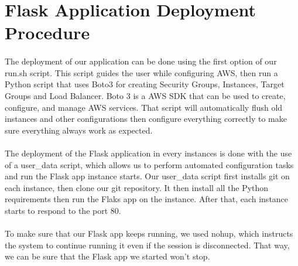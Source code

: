 \section{Flask Application Deployment Procedure} \label{T1}

\paragraph{}The deployment of our application can be done using the first option of our run.sh script. This script guides the user while configuring AWS, then run a Python script that uses Boto3 for creating Security Groups, Instances, Target Groups and Load Balancer. Boto 3 is a AWS SDK that can be used to create, configure, and manage AWS services. That script will automatically flush old instances and other configurations then configure everything correctly to make sure everything always work as expected.
\paragraph{}The deployment of the Flask application in every instances is done with the use of a user\_data script, which allows us to perform automated configuration tasks and run the Flask app instance starts. Our user\_data script first installs git on each instance, then clone our git repository. It then install all the Python requirements then run the Flaks app on the instance. After that, each instance starts to respond to the port 80.
\paragraph{}To make sure that our Flask app keeps running, we used nohup, which instructs the system to continue running it even if the session is disconnected. That way, we can be sure that the Flask app we started won't stop.